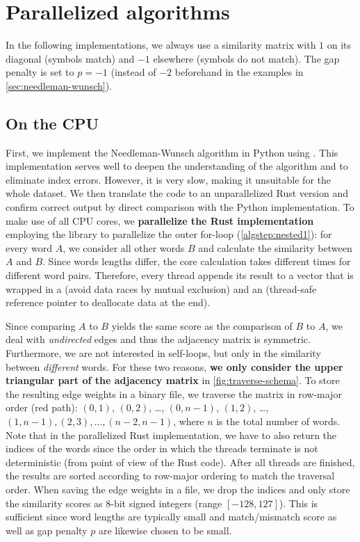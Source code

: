 \section{Parallelized algorithms}
\label{sec:impl}

In the following implementations, we always use a similarity matrix with $1$ on its diagonal (symbols match) and $-1$ elsewhere (symbols do not match). The gap penalty is set to $p=-1$ (instead of $-2$ beforehand in the examples in \autoref{sec:needleman-wunsch}).

\subsection{On the CPU}

First, we implement the Needleman-Wunsch algorithm in Python using . This implementation serves well to deepen the understanding of the algorithm and to eliminate index errors. However, it is very slow, making it unsuitable for the whole dataset. We then translate the code to an unparallelized Rust version and confirm correct output by direct comparison with the Python implementation. To make use of all CPU cores, we \textbf{parallelize the Rust implementation} employing the  library to parallelize the outer for-loop (\autoref{algstep:nested1}): for every word $A$, we consider all other words $B$ and calculate the similarity between $A$ and $B$. Since words lengths differ, the core calculation takes different times for different word pairs. Therefore, every thread appends its result to a vector that is wrapped in a  (avoid data races by mutual exclusion) and an  (thread-safe reference pointer to deallocate data at the end).

Since comparing $A$ to $B$ yields the same score as the comparison of $B$ to $A$, we deal with \textit{undirected} edges and thus the adjacency matrix is symmetric. Furthermore, we are not interested in self-loops, but only in the similarity between \textit{different} words. For these two reasons, \textbf{we only consider the upper triangular part of the adjacency matrix} in \autoref{fig:traverse-schema}. To store the resulting edge weights in a binary file, we traverse the matrix in row-major order (red path): $(0,1)$, $(0,2)$, \ldots, $(0,n-1)$, $(1,2)$, \ldots, $(1,n-1), (2,3), \ldots, (n-2,n-1)$, where $n$ is the total number of words. Note that in the parallelized Rust implementation, we have to also return the indices of the words since the order in which the threads terminate is not deterministic (from point of view of the Rust code). After all threads are finished, the results are sorted according to row-major ordering to match the traversal order. When saving the edge weights in a file, we drop the indices and only store the similarity scores as 8-bit signed integers (range $[-128,127]$). This is sufficient since word lengths are typically small and match/mismatch score as well as gap penalty $p$ are likewise chosen to be small.


